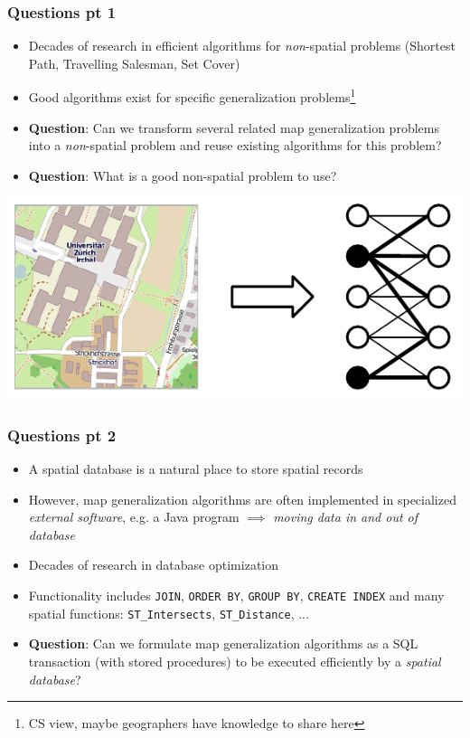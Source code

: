 \documentclass{beamer}
\begin{document}
\frame
{
  \frametitle{Questions pt 1}
  \begin{itemize}
  \item Decades of research in efficient algorithms for \emph{non}-spatial problems (Shortest Path, Travelling Salesman, Set Cover)
  \item Good algorithms exist for specific generalization problems\footnote{CS view, maybe geographers have knowledge to share here}~\cite{fusiontables,landcover}
  \item \textbf{Question}: Can we transform several related map generalization problems into a \emph{non}-spatial problem and reuse existing algorithms for this problem?
  \item \textbf{Question}: What is a good non-spatial problem to use?
  \end{itemize}
  
  \begin{center}
  \includegraphics[scale=0.6]{figs/cvl-spatial-to-nonspatial.pdf}
  \end{center}
}

\frame
{
  \frametitle{Questions pt 2}
  \begin{itemize}
  \item A spatial database is a natural place to store spatial records
  \item However, map generalization algorithms are often implemented in specialized \emph{external software}, e.g. a Java program $\implies$ \emph{moving data in and out of database}
  \item Decades of research in database optimization
  \item Functionality includes \texttt{JOIN}, \texttt{ORDER BY}, \texttt{GROUP BY},  \texttt{CREATE INDEX} and many spatial functions: \texttt{ST\_Intersects}, \texttt{ST\_Distance}, ...
  \item \textbf{Question}: Can we formulate map generalization algorithms as a SQL transaction (with stored procedures) to be executed efficiently by a \emph{spatial database}?
  \end{itemize}
}
\end{document}
